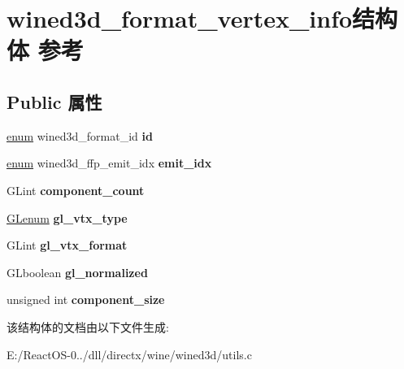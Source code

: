 \hypertarget{structwined3d__format__vertex__info}{}\section{wined3d\+\_\+format\+\_\+vertex\+\_\+info结构体 参考}
\label{structwined3d__format__vertex__info}
\subsection*{Public 属性}
\begin{DoxyCompactItemize}
\item 
\mbox{\label{structwined3d__format__vertex__info_a98a92dc85c3a0e8567b0ea58606107f6}} 
\hyperlink{interfaceenum}{enum} wined3d\+\_\+format\+\_\+id {\bfseries id}
\item 
\mbox{\label{structwined3d__format__vertex__info_a6c5deef0e22bdc4e4db9e7bcf9c23e67}} 
\hyperlink{interfaceenum}{enum} wined3d\+\_\+ffp\+\_\+emit\+\_\+idx {\bfseries emit\+\_\+idx}
\item 
\mbox{\label{structwined3d__format__vertex__info_af79217a70d738a2023a35c252fcb669f}} 
G\+Lint {\bfseries component\+\_\+count}
\item 
\mbox{\label{structwined3d__format__vertex__info_a4eb297cc9915a7fba4c4c85a0f31e7dd}} 
\hyperlink{interfacevoid}{G\+Lenum} {\bfseries gl\+\_\+vtx\+\_\+type}
\item 
\mbox{\label{structwined3d__format__vertex__info_a03b11db90fdd0bfcf8494a92e79cf64c}} 
G\+Lint {\bfseries gl\+\_\+vtx\+\_\+format}
\item 
\mbox{\label{structwined3d__format__vertex__info_a86888df4919107c18f2d02bcef0c830b}} 
G\+Lboolean {\bfseries gl\+\_\+normalized}
\item 
\mbox{\label{structwined3d__format__vertex__info_ab2ae89823ed9fba38d3faec5d318a092}} 
unsigned int {\bfseries component\+\_\+size}
\end{DoxyCompactItemize}


该结构体的文档由以下文件生成\+:\begin{DoxyCompactItemize}
\item 
E\+:/\+React\+O\+S-\/0../dll/directx/wine/wined3d/utils.\+c\end{DoxyCompactItemize}
